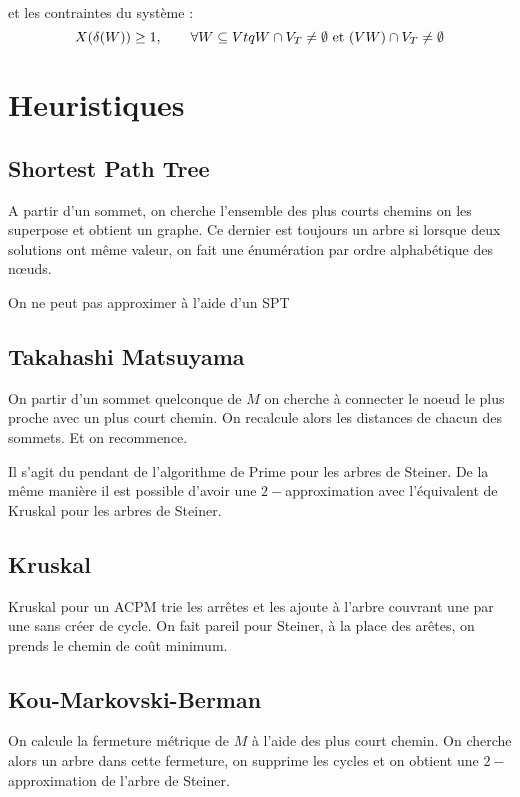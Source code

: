 \documentclass[a4paper,11pt]{thesis}
\begin{document}
et les contraintes du système :
\begin{displaymath}
    X(\delta(W)) \geq 1, \qquad \forall W \subseteq V tq W \cap V_T \neq \emptyset \mbox{ et } (V \\
    W) \cap V_T \neq \emptyset
\end{displaymath}

\section{Heuristiques}

\subsection{Shortest Path Tree}

A partir d'un sommet, on cherche l'ensemble des plus courts chemins on les superpose et obtient un
graphe. Ce dernier est toujours un arbre si lorsque deux solutions ont même valeur, on fait une
énumération par ordre alphabétique des n\oe uds.

On ne peut pas approximer à l'aide d'un SPT

\subsection{Takahashi Matsuyama}

On partir d'un sommet quelconque de $M$ on cherche à connecter le noeud le plus proche avec un plus
court chemin. On recalcule alors les distances de chacun des sommets. Et on recommence.

Il s'agit du pendant de l'algorithme de Prime pour les arbres de Steiner. De la même manière il est
possible d'avoir une $2-$approximation avec l'équivalent de Kruskal pour les arbres de Steiner.

\subsection{Kruskal}

Kruskal pour un ACPM trie les arrêtes et les ajoute à l'arbre couvrant une par une sans créer de
cycle. On fait pareil pour Steiner, à la place des arêtes, on prends le chemin de coût minimum.

\subsection{Kou-Markovski-Berman}

On calcule la fermeture métrique de $M$ à l'aide des plus court chemin. On cherche alors un arbre
dans cette fermeture, on supprime les cycles et on obtient une $2-$approximation de l'arbre de
Steiner.
\end{document}
